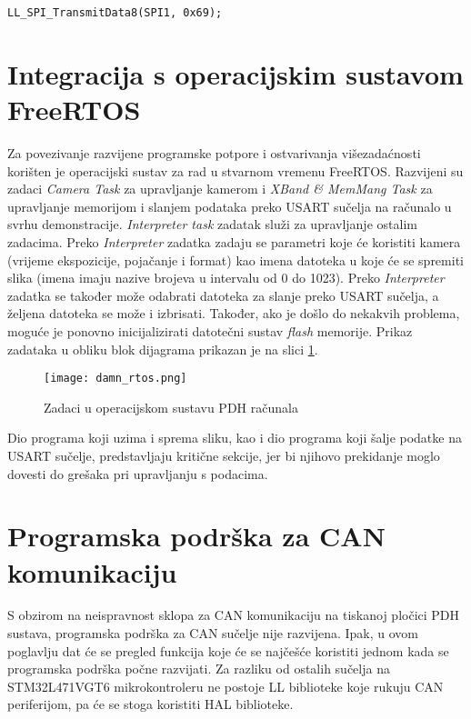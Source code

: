 \begin{lstlisting}[caption=Ispravan upis podatka u SPI2\_DR registar, label={lst:spi_dr_new}]
LL_SPI_TransmitData8(SPI1, 0x69);
\end{lstlisting}

\section{Integracija s operacijskim sustavom FreeRTOS}

Za povezivanje razvijene programske potpore i ostvarivanja višezadaćnosti korišten je operacijski sustav za rad u stvarnom vremenu FreeRTOS. Razvijeni su zadaci \textit{Camera Task} za upravljanje kamerom i \textit{XBand \& MemMang Task} za upravljanje memorijom i slanjem podataka preko USART sučelja na računalo u svrhu demonstracije. \textit{Interpreter task} zadatak služi za upravljanje ostalim zadacima. Preko \textit{Interpreter} zadatka zadaju se parametri koje će koristiti kamera (vrijeme ekspozicije, pojačanje i format) kao imena datoteka u koje će se spremiti slika (imena imaju nazive brojeva u intervalu od 0 do 1023). Preko \textit{Interpreter} zadatka se također može odabrati datoteka za slanje preko USART sučelja, a željena datoteka se može i izbrisati. Također, ako je došlo do nekakvih problema, moguće je ponovno inicijalizirati datotečni sustav \textit{flash} memorije.
Prikaz zadataka u obliku blok dijagrama prikazan je na slici \ref{fig:tasks}.

\begin{figure}[H]
	\centering
	\texttt{[image: damn\_rtos.png]}
	\caption{Zadaci u operacijskom sustavu PDH računala}
	\label{fig:tasks}
\end{figure}

\noindent Dio programa koji uzima i sprema sliku, kao i dio programa koji šalje podatke na USART sučelje, predstavljaju kritične sekcije, jer bi njihovo prekidanje moglo dovesti do grešaka pri upravljanju s podacima.

\section{Programska podrška za CAN komunikaciju}

S obzirom na neispravnost sklopa za CAN komunikaciju na tiskanoj pločici PDH sustava, programska podrška za CAN sučelje nije razvijena. Ipak, u ovom poglavlju dat će se pregled funkcija koje će se najčešće koristiti jednom kada se programska podrška počne razvijati. Za razliku od ostalih sučelja na STM32L471VGT6 mikrokontroleru ne postoje LL biblioteke koje rukuju CAN periferijom, pa će se stoga koristiti HAL biblioteke.

